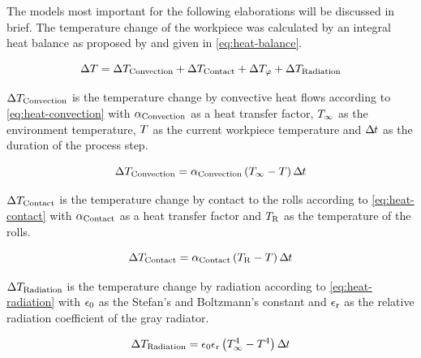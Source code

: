 
The models most important for the following elaborations will be discussed in brief.
The temperature change of the workpiece was calculated by an integral heat balance as proposed by \textcite{Hensel1990} and given in \autoref{eq:heat-balance}.

\begin{equation}
    \Delta{T} = \Delta{T}_{\mathrm{Convection}} + \Delta{T}_{\mathrm{Contact}} + \Delta{T}_{{\varphi}} + \Delta{T}_{\mathrm{Radiation}}
    \label{eq:heat-balance}
\end{equation}

\noindent$\Delta{T}_{\mathrm{Convection}}$ is the temperature change by convective heat flows according to \autoref{eq:heat-convection} with ${\alpha}_{{\mathrm{Convection}}}$ as a heat transfer factor, ${T}_{\infty}$ as the environment temperature, ${T}$ as the current workpiece temperature and ${\Delta\mspace{-1mu}t}$ as the duration of the process step.

\begin{equation}
    \Delta{T}_{\mathrm{Convection}} = {\alpha}_{{\mathrm{Convection}}} \left( {T}_{\infty} - {T} \right) {\Delta\mspace{-1mu}t}
    \label{eq:heat-convection}
\end{equation}

\noindent$\Delta{T}_{\mathrm{Contact}}$ is the temperature change by contact to the rolls according to \autoref{eq:heat-contact} with ${\alpha}_{{\mathrm{Contact}}}$ as a heat transfer factor and ${T}_{{\mathrm{R}}}$ as the temperature of the rolls.

\begin{equation}
    \Delta{T}_{\mathrm{Contact}} = {\alpha}_{{\mathrm{Contact}}} \left( {T}_{\mathrm{R}} - {T} \right) {\Delta\mspace{-1mu}t}
    \label{eq:heat-contact}
\end{equation}

\noindent$\Delta{T}_{\mathrm{Radiation}}$ is the temperature change by radiation according to \autoref{eq:heat-radiation} with ${\epsilon_0}$ as the Stefan's and Boltzmann's constant and ${\epsilon_\mathrm{r}}$ as the relative radiation coefficient of the gray radiator.

\begin{equation}
    \Delta{T}_{\mathrm{Radiation}} = {\epsilon_0} {\epsilon_\mathrm{r}} \left( {T}_{\infty}^4 - {T}^4 \right) {\Delta\mspace{-1mu}t}
    \label{eq:heat-radiation}
\end{equation}

